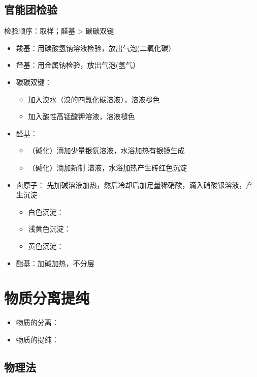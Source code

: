 \documentclass[10pt]{article}
\begin{document}
	\subsection{官能团检验}
	检验顺序：取样；醛基 > 碳碳双键
	\begin{itemize}
		\item 羧基：用碳酸氢钠溶液检验，放出气泡(二氧化碳）
		\item 羟基：用金属钠检验，放出气泡(氢气）
		\item 碳碳双键：
		\begin{itemize}
			\item 加入溴水（溴的四氯化碳溶液），溶液褪色
			\item 加入酸性高锰酸钾溶液，溶液褪色
		\end{itemize}
		\item 醛基：
		\begin{itemize}
			\item （碱化）滴加少量银氨溶液，水浴加热有银镜生成
			\item （碱化）滴加新制 溶液，水浴加热产生砖红色沉淀
		\end{itemize}
		\item 卤原子： 先加碱溶液加热，然后冷却后加足量稀硝酸，滴入硝酸银溶液，产生沉淀
		\begin{itemize}
			\item 白色沉淀： 
			\item 浅黄色沉淀： 
			\item 黄色沉淀： 
		\end{itemize}
		\item 酯基：加碱加热，不分层
	\end{itemize}
	
	
	\clearpage
	\section{物质分离提纯}
	
	\begin{itemize}
		\item 物质的分离：
		\item 物质的提纯：
	\end{itemize}
	
	
	\subsection{物理法}
	
\end{document}
